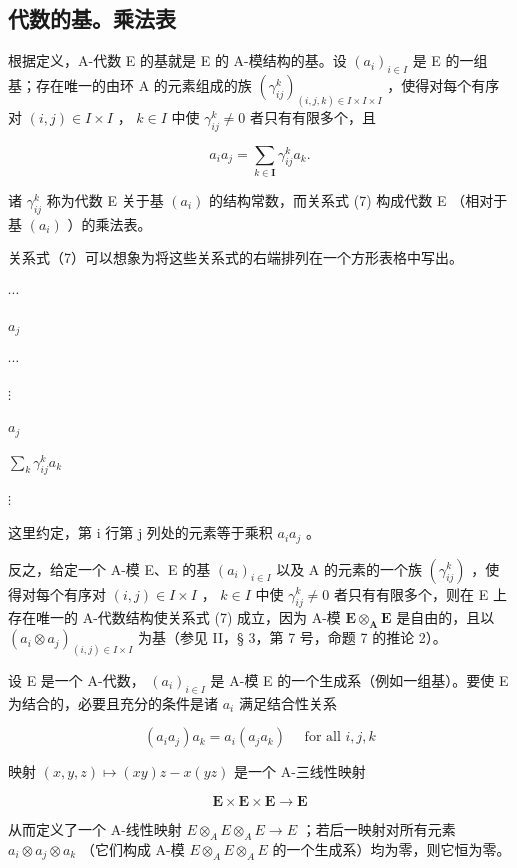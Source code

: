 \subsection{代数的基。乘法表}

根据定义，A-代数 E 的基就是 E 的 A-模结构的基。设 \((a_{i})_{i\in I}\) 是 E 的一组基；存在唯一的由环 A 的元素组成的族 \((\gamma_{ij}^{k})_{(i,j,k)\in I\times I\times I}\) ，使得对每个有序对 \((i,j)\in I\times I\) ， \(k\in I\) 中使 \(\gamma_{ij}^{k}\neq 0\) 者只有有限多个，且

\[
a _ {i} a _ {j} = \sum_ {k \in \mathbf {I}} \gamma_ {i j} ^ {k} a _ {k}.\tag{7}
\]

诸 \(\gamma_{ij}^{k}\) 称为代数 E 关于基 \((a_{i})\) 的结构常数，而关系式 (7) 构成代数 E （相对于基 \((a_{i})\) ）的乘法表。

关系式（7）可以想象为将这些关系式的右端排列在一个方形表格中写出。

\(\cdots\)

\(a_j\)

\(\cdots\)

\(\vdots\)

\(a_j\)

\(\sum_{k} \gamma_{ij}^{k} a_k\)

\(\vdots\)

这里约定，第 i 行第 j 列处的元素等于乘积 \(a_{i}a_{j}\) 。

反之，给定一个 A-模 E、E 的基 \((a_{i})_{i\in I}\) 以及 A 的元素的一个族 \((\gamma_{ij}^{k})\) ，使得对每个有序对 \((i,j)\in I\times I\) ， \(k\in I\) 中使 \(\gamma_{ij}^{k}\neq 0\) 者只有有限多个，则在 E 上存在唯一的 A-代数结构使关系式 (7) 成立，因为 A-模 \(\mathbf{E}\otimes_{\mathbf{A}}\mathbf{E}\) 是自由的，且以 \((a_{i}\otimes a_{j})_{(i,j)\in I\times I}\) 为基（参见 II，§ 3，第 7 号，命题 7 的推论 2）。

设 E 是一个 A-代数， \((a_{i})_{i\in I}\) 是 A-模 E 的一个生成系（例如一组基）。要使 E 为结合的，必要且充分的条件是诸 \(a_{i}\) 满足结合性关系

\[
(a _ {i} a _ {j}) a _ {k} = a _ {i} (a _ {j} a _ {k}) \quad \text { for   all } i, j, k\tag{8}
\]

映射 \((x, y, z) \mapsto (xy)z - x(yz)\) 是一个 A-三线性映射

\[
\mathbf {E} \times \mathbf {E} \times \mathbf {E} \rightarrow \mathbf {E}
\]

从而定义了一个 A-线性映射 \(E \otimes_{A} E \otimes_{A} E \to E\) ；若后一映射对所有元素 \(a_{i} \otimes a_{j} \otimes a_{k}\) （它们构成 A-模 \(E \otimes_{A} E \otimes_{A} E\) 的一个生成系）均为零，则它恒为零。

